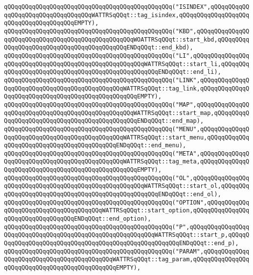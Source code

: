 \verb|qQQqqQQqqQQqqQQqqQQqqQQqqQQqqQQqqQQqqQQqqQQqqQQq("ISINDEX",qQQqqQQqqQQqqQQqqQQqqQQqqQQqqQQqqQQqWATTRSqQQqt::tag_isindex,qQQqqQQqqQQqqQQqqQQqqQQqqQQqqQQqqQQqqQQqEMPTY),|\newline
\verb|qQQqqQQqqQQqqQQqqQQqqQQqqQQqqQQqqQQqqQQqqQQqqQQq("KBD",qQQqqQQqqQQqqQQqqQQqqQQqqQQqqQQqqQQqqQQqqQQqqQQqqQQqWOATTRSqQQqt::start_kbd,qQQqqQQqqQQqqQQqqQQqqQQqqQQqqQQqqQQqqQQqqQQqENDqQQqt::end_kbd),|\newline
\verb|qQQqqQQqqQQqqQQqqQQqqQQqqQQqqQQqqQQqqQQqqQQqqQQq("LI",qQQqqQQqqQQqqQQqqQQqqQQqqQQqqQQqqQQqqQQqqQQqqQQqqQQqqQQqWATTRSqQQqt::start_li,qQQqqQQqqQQqqQQqqQQqqQQqqQQqqQQqqQQqqQQqqQQqqQQqqQQqENDqQQqt::end_li),|\newline
\verb|qQQqqQQqqQQqqQQqqQQqqQQqqQQqqQQqqQQqqQQqqQQqqQQq("LINK",qQQqqQQqqQQqqQQqqQQqqQQqqQQqqQQqqQQqqQQqqQQqqQQqWATTRSqQQqt::tag_link,qQQqqQQqqQQqqQQqqQQqqQQqqQQqqQQqqQQqqQQqqQQqqQQqqQQqEMPTY),|\newline
\verb|qQQqqQQqqQQqqQQqqQQqqQQqqQQqqQQqqQQqqQQqqQQqqQQq("MAP",qQQqqQQqqQQqqQQqqQQqqQQqqQQqqQQqqQQqqQQqqQQqqQQqqQQqWATTRSqQQqt::start_map,qQQqqQQqqQQqqQQqqQQqqQQqqQQqqQQqqQQqqQQqqQQqqQQqENDqQQqt::end_map),|\newline
\verb|qQQqqQQqqQQqqQQqqQQqqQQqqQQqqQQqqQQqqQQqqQQqqQQq("MENU",qQQqqQQqqQQqqQQqqQQqqQQqqQQqqQQqqQQqqQQqqQQqqQQqWATTRSqQQqt::start_menu,qQQqqQQqqQQqqQQqqQQqqQQqqQQqqQQqqQQqqQQqqQQqENDqQQqt::end_menu),|\newline
\verb|qQQqqQQqqQQqqQQqqQQqqQQqqQQqqQQqqQQqqQQqqQQqqQQq("META",qQQqqQQqqQQqqQQqqQQqqQQqqQQqqQQqqQQqqQQqqQQqqQQqWATTRSqQQqt::tag_meta,qQQqqQQqqQQqqQQqqQQqqQQqqQQqqQQqqQQqqQQqqQQqqQQqqQQqEMPTY),|\newline
\verb|qQQqqQQqqQQqqQQqqQQqqQQqqQQqqQQqqQQqqQQqqQQqqQQq("OL",qQQqqQQqqQQqqQQqqQQqqQQqqQQqqQQqqQQqqQQqqQQqqQQqqQQqqQQqWATTRSqQQqt::start_ol,qQQqqQQqqQQqqQQqqQQqqQQqqQQqqQQqqQQqqQQqqQQqqQQqqQQqENDqQQqt::end_ol),|\newline
\verb|qQQqqQQqqQQqqQQqqQQqqQQqqQQqqQQqqQQqqQQqqQQqqQQq("OPTION",qQQqqQQqqQQqqQQqqQQqqQQqqQQqqQQqqQQqqQQqWATTRSqQQqt::start_option,qQQqqQQqqQQqqQQqqQQqqQQqqQQqqQQqqQQqENDqQQqt::end_option),|\newline
\verb|qQQqqQQqqQQqqQQqqQQqqQQqqQQqqQQqqQQqqQQqqQQqqQQq("P",qQQqqQQqqQQqqQQqqQQqqQQqqQQqqQQqqQQqqQQqqQQqqQQqqQQqqQQqqQQqWATTRSqQQqt::start_p,qQQqqQQqqQQqqQQqqQQqqQQqqQQqqQQqqQQqqQQqqQQqqQQqqQQqqQQqENDqQQqt::end_p),|\newline
\verb|qQQqqQQqqQQqqQQqqQQqqQQqqQQqqQQqqQQqqQQqqQQqqQQq("PARAM",qQQqqQQqqQQqqQQqqQQqqQQqqQQqqQQqqQQqqQQqqQQqWATTRSqQQqt::tag_param,qQQqqQQqqQQqqQQqqQQqqQQqqQQqqQQqqQQqqQQqqQQqqQQqEMPTY),|\newline
